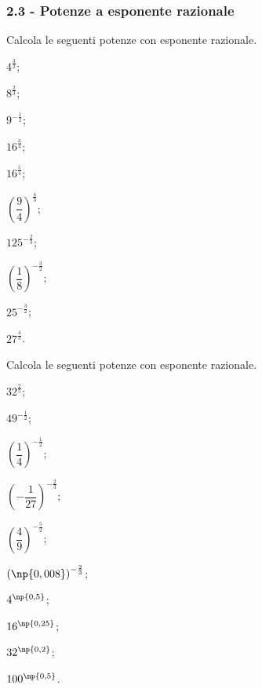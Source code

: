 \subsubsection*{2.3 - Potenze a esponente razionale}
\begin{esercizio}
 \label{ese:2.17}
Calcola le seguenti potenze con esponente razionale.
 \begin{multicols}{3}
 \begin{enumeratea}
 \item $4^{\frac 3 2}$;
 \item $8^{\frac 2 3}$;
 \item $9^{-\frac 1 2}$;
 \item $16^{\frac 3 4}$;
 \item $16^{\frac 5 4}$;
 \item $\left(\dfrac 9 4\right)^{\frac 4 3}$;
 \item $125^{-\frac 2 3}$;
 \item $\left(\dfrac 1 8\right)^{-\frac 3 2}$;
 \item $25^{-\frac 3 2}$;
 \item $27^{\frac 4 3}$.
 \end{enumeratea}
 \end{multicols}
\end{esercizio}

\begin{esercizio}[\Ast]
 \label{ese:2.18}
Calcola le seguenti potenze con esponente razionale.
 \begin{multicols}{3}
 \begin{enumeratea}
 \item $32^{\frac 2 5}$;
 \item $49^{-\frac 1 2}$;
 \item $\left(\dfrac 1 4\right)^{-\frac 1 2}$;
 \item $\left(-\dfrac 1{27}\right)^{-\frac 2 3}$;
 \item $\left(\dfrac 4 9\right)^{-\frac 5 2}$;
 \item $\left(\np{0,008}\right)^{-\frac 2 3}$;
 \item $4^{\np{0,5}}$;
 \item $16^{\np{0,25}}$;
 \item $32^{\np{0,2}}$;
 \item $100^{\np{0,5}}$.
 \end{enumeratea}
 \end{multicols}
\end{esercizio}


